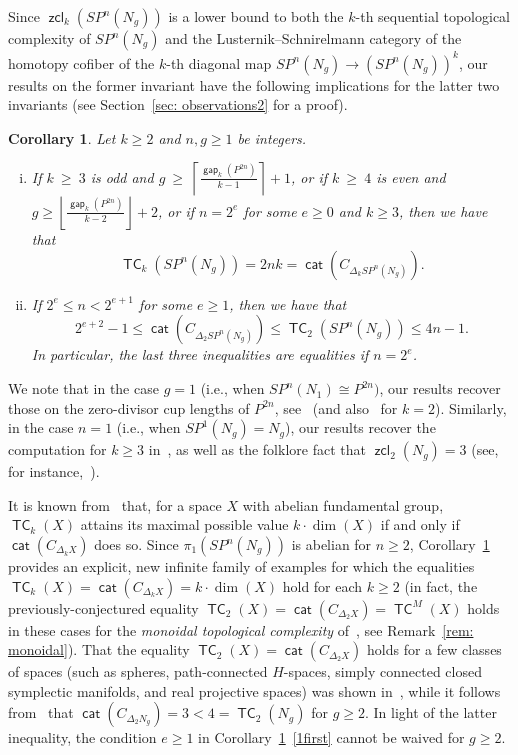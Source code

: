 \documentclass[amscd,amssymb,verbatim,10pt]{amsart}
\numberwithin{equation}{section}
\theoremstyle{plain}
\newtheorem{corollary}[thm]{Corollary}
\theoremstyle{definition}
\DeclareMathOperator{\cat}{{\mathsf{cat}}}
\DeclareMathOperator{\TC}{{\mathsf{TC}}}
\DeclareMathOperator{\zcl}{{\mathsf{zcl}}}
\DeclareMathOperator{\gap}{{\mathsf{gap}}}
\begin{document}
Since $\zcl_k(SP^n(N_g))$ is a lower bound to both the $k$-th sequential topological complexity of $SP^n(N_g)$ and the Lusternik--Schnirelmann category of the homotopy cofiber of the $k$-th diagonal map $SP^n(N_g)\to (SP^n(N_g))^k$, our results on the former invariant have the following implications for the latter two invariants (see Section~\ref{sec: observations2} for a proof). 

\begin{corollary}\label{cor: tc_k}
   Let $k\ge 2$ and $n,g\ge 1$ be integers.
   \begin{enumerate}[(i)]
       \item If $k\ \ge \ 3$ is odd and $g\ \ge \ \left\lceil\tfrac{\gap_k(P^{2n})}{k-1}\right\rceil+1$, or if $k\ \ge\ 4$ is even and $g\ge\left\lfloor\tfrac{\gap_k(P^{2n})}{k-2}\right\rfloor+2$, or if $n=2^e$ for some $e\ge 0$ and $k\ge 3$, then we have that 
    \[
\TC_k(SP^n(N_g))=2nk=\cat(C_{\Delta_kSP^n(N_g)}).
    \] \label{2second}
    \item If $2^e\le n<2^{e+1}$ for some $e\ge 1$, then we have that
    \[
2^{e+2}-1\le\cat(C_{\Delta_2SP^n(N_g)})\le\TC_2(SP^n(N_g))\le 4n-1.
    \]
    In particular, the last three inequalities are equalities if $n=2^e$.
    \label{1first}
   \end{enumerate}
\end{corollary}

We note that in the case $g=1$ (i.e., when $SP^n(N_1)\cong P^{2n})$, our results recover those on the zero-divisor cup lengths of $P^{2n}$, see~\cite{Dav} (and also~\cite{CAG+} for $k=2$). Similarly, in the case $n=1$ (i.e., when $SP^1(N_g)=N_g$), our results recover the computation for $k\ge 3$ in~\cite[Section~5]{GGGL}, as well as the folklore fact that $\zcl_2(N_g)=3$ (see, for instance,~\cite[proof of Theorem~3.4.4]{Dr2}).

It is known from~\cite[Proposition~2.1~(2)]{CAC} that, for a space $X$ with abelian fundamental group, $\TC_k(X)$ attains its maximal possible value $k\cdot \dim(X)$ if and only if $\cat(C_{\Delta_kX})$ does so. Since $\pi_1(SP^n(N_g))$ is abelian for $n\ge 2$, Corollary~\ref{cor: tc_k} provides an explicit, new infinite family of examples for which the equalities $\TC_k(X)=\cat(C_{\Delta_kX})=k\cdot \dim(X)$ hold for each $k\ge 2$ (in fact, the previously-conjectured equality $\TC_2(X)=\cat(C_{\Delta_2X})=\TC^M(X)$ holds in these cases for the \emph{monoidal topological complexity} of~\cite{IS}, see Remark~\ref{rem: monoidal}). That the equality $\TC_2(X)=\cat(C_{\Delta_2X})$ holds for a few classes of spaces (such as spheres, path-connected $H$-spaces, simply connected closed symplectic manifolds, and real projective spaces) was shown in~\cite{GV}, while it follows from~\cite{Dr2,Dr3,CV1} that $\cat(C_{\Delta_2N_g})=3<4=\TC_2(N_g)$ for $g\ge 2$. In light of the latter inequality, the condition $e\ge 1$ in Corollary~\ref{cor: tc_k}~\eqref{1first} cannot be waived for $g\ge 2$.
\end{document}
